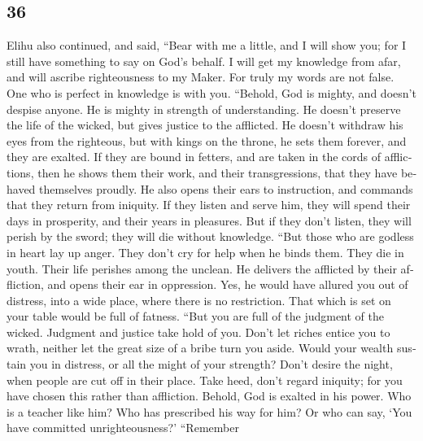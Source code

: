 \begin{paracol}{2}
\begin{otherlanguage}{english}
\hypertarget{section-71}{%
\section{36}\label{section-71}}

 Elihu also continued, and said,  ``Bear
with me a little, and I will show you; for I still have something to say
on God's behalf.  I will get my knowledge from afar, and
will ascribe righteousness to my Maker.  For truly my
words are not false. One who is perfect in knowledge is with you.
 ``Behold, God is mighty, and doesn't despise anyone. He
is mighty in strength of understanding.  He doesn't
preserve the life of the wicked, but gives justice to the afflicted.
 He doesn't withdraw his eyes from the righteous, but with
kings on the throne, he sets them forever, and they are exalted.
 If they are bound in fetters, and are taken in the cords
of afflictions,  then he shows them their work, and their
transgressions, that they have behaved themselves proudly.
 He also opens their ears to instruction, and commands
that they return from iniquity.  If they listen and serve
him, they will spend their days in prosperity, and their years in
pleasures.  But if they don't listen, they will perish by
the sword; they will die without knowledge.  ``But those
who are godless in heart lay up anger. They don't cry for help when he
binds them.  They die in youth. Their life perishes among
the unclean.  He delivers the afflicted by their
affliction, and opens their ear in oppression.  Yes, he
would have allured you out of distress, into a wide place, where there
is no restriction. That which is set on your table would be full of
fatness.  ``But you are full of the judgment of the
wicked. Judgment and justice take hold of you.  Don't let
riches entice you to wrath, neither let the great size of a bribe turn
you aside.  Would your wealth sustain you in distress, or
all the might of your strength?  Don't desire the night,
when people are cut off in their place.  Take heed, don't
regard iniquity; for you have chosen this rather than affliction.
 Behold, God is exalted in his power. Who is a teacher
like him?  Who has prescribed his way for him? Or who can
say, `You have committed unrighteousness?'  ``Remember

\end{otherlanguage}
\end{paracol}

